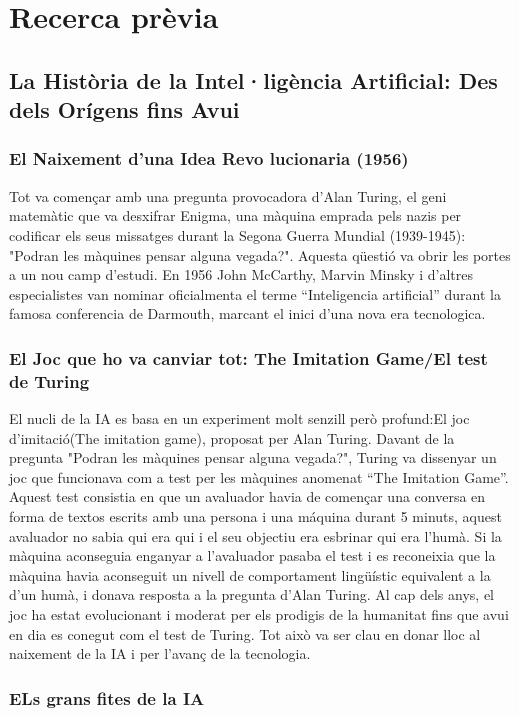 \chapter{Recerca prèvia}
\label{c:intro}
\section{La Història de la Intel·ligència Artificial: Des dels Orígens fins Avui}
\subsection{El Naixement d'una Idea Revo lucionaria (1956)}
Tot va començar amb una pregunta provocadora d’Alan Turing, el geni matemàtic que va desxifrar Enigma, una màquina emprada pels nazis per codificar els seus missatges durant la Segona Guerra Mundial (1939-1945): "Podran les màquines pensar alguna vegada?". Aquesta qüestió va obrir les portes a un nou camp d’estudi. En 1956 John McCarthy, Marvin Minsky i d'altres especialistes van nominar oficialmenta el terme ``Inteligencia artificial'' durant la famosa conferencia de Darmouth, marcant el inici d'una nova era tecnologica.
\subsection{El Joc que ho va canviar tot: The Imitation Game/El test de Turing}
El nucli de la IA es basa en un experiment molt senzill però profund:El joc d'imitació(The imitation game), proposat per Alan Turing. Davant de la pregunta "Podran les màquines pensar alguna vegada?", Turing va dissenyar un joc que funcionava com a test per les màquines anomenat ``The Imitation Game''. Aquest test consistia en que un avaluador havia de començar una conversa en forma de textos escrits amb una persona i una máquina durant 5 minuts, aquest avaluador no sabia qui era qui i el seu objectiu era esbrinar qui era l'humà. Si la màquina aconseguia enganyar a l'avaluador pasaba el test i es reconeixia que la màquina havia aconseguit un nivell de comportament lingüístic equivalent a la d'un humà, i donava resposta a la pregunta d'Alan Turing. Al cap dels anys, el joc ha estat evolucionant i moderat per els prodigis de la humanitat fins que avui en dia es conegut com el test de Turing. Tot això va ser clau en  donar lloc al naixement de la IA i per l'avanç de la tecnologia.
\subsection{ELs grans fites de la IA}
